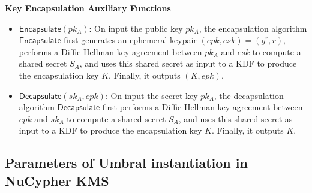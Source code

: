 \documentclass[12pt]{article}
\begin{document}
\textbf{Key Encapsulation Auxiliary Functions}
\begin{itemize}
	\item $\mathsf{Encapsulate}(pk_A)$: On input the public key $pk_A$, %
	the encapsulation algorithm $\mathsf{Encapsulate}$ first generates an ephemeral keypair $(epk, esk) = (g^r, r)$, performs a Diffie-Hellman key agreement between $pk_A$ and $esk$ to compute a shared secret $S_A$, and uses this shared secret as input to a KDF to produce the encapsulation key $K$. Finally, it outputs $(K, epk)$.
	\item $\mathsf{Decapsulate}(sk_A, epk)$: On input the secret key $pk_A$, %
	the decapsulation algorithm $\mathsf{Decapsulate}$ first performs a Diffie-Hellman key agreement between $epk$ and $sk_A$ to compute a shared secret $S_A$, and uses this shared secret as input to a KDF to produce the encapsulation key $K$. Finally, it outputs $K$.
\end{itemize}

\subsection{Parameters of Umbral instantiation in NuCypher KMS}



\end{document}
